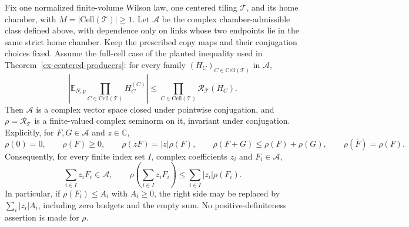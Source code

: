\begin{lemma}
\label{lem:ex-centered-root-seminorm}
Fix one normalized finite-volume Wilson law, one centered tiling
$\mathcal T$, and its home chamber, with
$M=|\mathrm{Cell}(\mathcal T)|\geq1$. Let $\mathcal A$ be the complex
chamber-admissible class defined above, with dependence only on links whose
two endpoints lie in the same strict home chamber. Keep the prescribed
copy maps and their conjugation choices fixed. Assume the full-cell case
of the planted inequality used in Theorem~\ref{ex-centered-producers}:
for every family $(H_C)_{C\in\mathrm{Cell}(\mathcal T)}$ in $\mathcal A$,
\begin{equation}\label{eq:ex-centered-root-planted}
 \left|\mathbb E_{N,p}
       \prod_{C\in\mathrm{Cell}(\mathcal T)}H_C^{(C)}\right|
 \leq\prod_{C\in\mathrm{Cell}(\mathcal T)}\mathcal R_{\mathcal T}(H_C).
\end{equation}
Then $\mathcal A$ is a complex vector space closed under pointwise
conjugation, and $\rho=\mathcal R_{\mathcal T}$ is a finite-valued
complex seminorm on it, invariant under conjugation. Explicitly,
for $F,G\in\mathcal A$ and $z\in\mathbb C$,
\[
 \rho(0)=0,\qquad \rho(F)\geq0,\qquad
 \rho(zF)=|z|\rho(F),\qquad
 \rho(F+G)\leq\rho(F)+\rho(G),\qquad
 \rho(\overline F)=\rho(F).
\]
Consequently, for every finite index set $I$, complex coefficients $z_i$
and $F_i\in\mathcal A$,
\begin{equation}\label{eq:ex-centered-root-finite-sum}
 \sum_{i\in I}z_iF_i\in\mathcal A,\qquad
 \rho\!\left(\sum_{i\in I}z_iF_i\right)
 \leq\sum_{i\in I}|z_i|\rho(F_i).
\end{equation}
In particular, if $\rho(F_i)\leq A_i$ with $A_i\geq0$, the right side
may be replaced by $\sum_i|z_i|A_i$, including zero budgets and the
empty sum. No positive-definiteness assertion is made for $\rho$.
\end{lemma}
